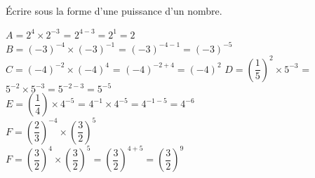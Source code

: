     Écrire sous la forme d'une puissance d'un nombre.
        \begin{spacing}{2}
            $A=2^4\times 2^{-3}$                                                   {\red = $2^{4-3}=2^1=2$} \\
            $B=(-3)^{-4}\times (-3)^{-1}$                                          {\red = $(-3)^{-4-1}=(-3)^{-5}$} \\
            $C=(-4)^{-2}\times (-4)^4$                                             {\red = $(-4)^{-2+4}=(-4)^2$}
            $D=\left(\dfrac{1}{5}\right)^2\times 5^{-3}$                           {\red = $5^{-2}\times 5^{-3}=5^{-2-3}=5^{-5}$}  \\
            $E=\left(\dfrac{1}{4}\right)\times 4^{-5}$                             {\red = $4^{-1}\times 4^{-5}=4^{-1-5}=4^{-6}$}  \\
            $F=\left(\dfrac{2}{3}\right)^{-4}\times \left(\dfrac{3}{2}\right)^5$   \\
            {\red $F=\left(\dfrac{3}{2}\right)^4\times \left(\dfrac{3}{2}\right)^5=\left(\dfrac{3}{2}\right)^{4+5}=\left(\dfrac{3}{2}\right)^9$}
        \end{spacing}
